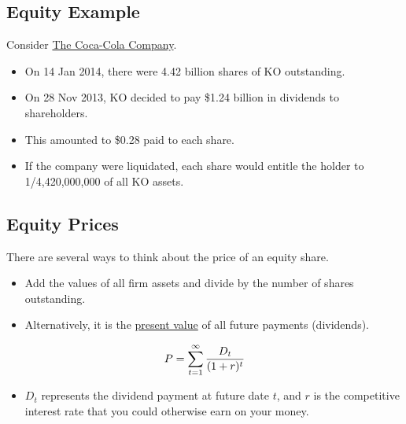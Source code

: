 \documentclass[letterpaper,10pt,english]{sphinxmanual}
\begin{document}
\subsection{Equity Example}
\label{assetClasses:equity-example}
Consider \href{http://bit.ly/1ckSWAC}{The Coca-Cola Company}.
\begin{itemize}
\item {} 
On 14 Jan 2014, there were 4.42 billion shares of KO
outstanding.

\end{itemize}
\begin{itemize}
\item {} 
On 28 Nov 2013, KO decided to pay \$1.24 billion in dividends to
shareholders.

\end{itemize}
\begin{itemize}
\item {} 
This amounted to \$0.28 paid to each share.

\end{itemize}
\begin{itemize}
\item {} 
If the company were liquidated, each share would entitle the holder
to 1/4,420,000,000 of all KO assets.

\end{itemize}


\subsection{Equity Prices}
\label{assetClasses:equity-prices}
There are several ways to think about the price of an equity share.
\begin{itemize}
\item {} 
Add the values of all firm assets and divide by the number of shares
outstanding.

\end{itemize}
\begin{itemize}
\item {} 
Alternatively, it is the \href{http://en.wikipedia.org/wiki/Present\_value}{present value} of all future
payments (dividends).

\end{itemize}
\begin{gather}
\begin{split}P = \sum_{t=1}^{\infty} \frac{D_t}{(1+r)^t}\end{split}\notag
\end{gather}\begin{itemize}
\item {} 
$D_t$ represents the dividend payment at future date
$t$, and $r$ is the competitive interest rate that you could otherwise earn on your money.

\end{itemize}
\end{document}
